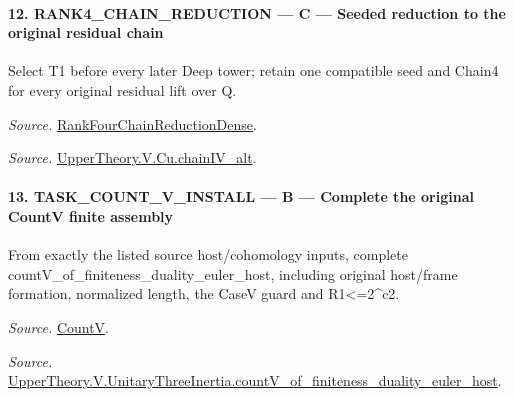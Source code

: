 \documentclass[11pt,a4paper]{article}
\numberwithin{equation}{section}
\theoremstyle{remark}\newtheorem{remark}[theorem]{Remark}
\begin{document}
\paragraph{12. RANK4\_\allowbreak CHAIN\_\allowbreak REDUCTION — C — Seeded reduction to the original residual chain}

Select T1 before every later Deep tower; retain one compatible seed and Chain4 for every original residual lift over Q.

\emph{Source.} \href{https://github.com/CocoSgt/riemann-hypothesis-lean/blob/7cbf7a0c32fca1badf05931879a37c3f8a2b03b4/src/Development/AutomorphicArithmetic/AutomorphicVarieties/ModularityArgument/ThresholdArguments/DenseThresholdCases/PromodularityCaseThree.lean#L33-L39}{RankFourChainReductionDense}.

\emph{Source.} \href{https://github.com/CocoSgt/riemann-hypothesis-lean/blob/7cbf7a0c32fca1badf05931879a37c3f8a2b03b4/src/Development/AutomorphicArithmetic/AutomorphicVarieties/ModularityArgument/ThresholdArguments/DenseThresholdCases/CuPChainIV.lean#L16-L82}{UpperTheory.V.Cu.chainIV\_\allowbreak alt}.



\paragraph{13. TASK\_\allowbreak COUNT\_\allowbreak V\_\allowbreak INSTALL — B — Complete the original CountV finite assembly}

From exactly the listed source host/cohomology inputs, complete countV\_\allowbreak of\_\allowbreak finiteness\_\allowbreak duality\_\allowbreak euler\_\allowbreak host, including original host/frame formation, normalized length, the CaseV guard and R1<=2\textasciicircum{}c2.

\emph{Source.} \href{https://github.com/CocoSgt/riemann-hypothesis-lean/blob/7cbf7a0c32fca1badf05931879a37c3f8a2b03b4/src/Development/AutomorphicArithmetic/AutomorphicVarieties/HeightAndVanishing/Counts.lean#L69-L69}{CountV}.

\emph{Source.} \href{https://github.com/CocoSgt/riemann-hypothesis-lean/blob/7cbf7a0c32fca1badf05931879a37c3f8a2b03b4/src/Development/AutomorphicArithmetic/AutomorphicVarieties/ModularityArgument/ThresholdArguments/DenseThresholdCases/CountVOf.lean#L33-L60}{UpperTheory.V.UnitaryThreeInertia.countV\_\allowbreak of\_\allowbreak finiteness\_\allowbreak duality\_\allowbreak euler\_\allowbreak host}.
\end{document}

